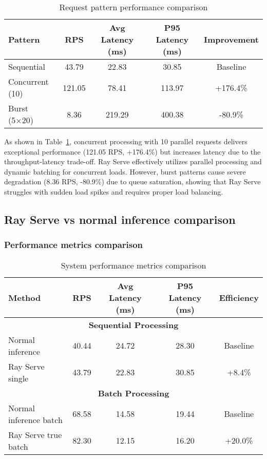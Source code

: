 \begin{table}[htbp]
\centering
\caption{Request pattern performance comparison}
\label{tab:request_patterns}
\begin{tabular}{|l|c|c|c|c|}
\hline
\textbf{Pattern} & \textbf{RPS} & \textbf{Avg Latency (ms)} & \textbf{P95 Latency (ms)} & \textbf{Improvement} \\
\hline
Sequential & 43.79 & 22.83 & 30.85 & Baseline \\
Concurrent (10) & 121.05 & 78.41 & 113.97 & +176.4\% \\
Burst (5×20) & 8.36 & 219.29 & 400.38 & -80.9\% \\
\hline
\end{tabular}
\end{table}

As shown in Table~\ref{tab:request_patterns}, concurrent processing with 10 parallel requests delivers exceptional performance (121.05 RPS, +176.4\%) but increases latency due to the throughput-latency trade-off. Ray Serve effectively utilizes parallel processing and dynamic batching for concurrent loads. However, burst patterns cause severe degradation (8.36 RPS, -80.9\%) due to queue saturation, showing that Ray Serve struggles with sudden load spikes and requires proper load balancing.

\subsection{Ray Serve vs normal inference comparison}

\subsubsection{Performance metrics comparison}

\begin{table}[htbp]
\centering
\caption{System performance metrics comparison}
\label{tab:system_comparison}
\begin{tabular}{|l|c|c|c|c|}
\hline
\textbf{Method} & \textbf{RPS} & \textbf{Avg Latency (ms)} & \textbf{P95 Latency (ms)} & \textbf{Efficiency} \\
\hline
\multicolumn{5}{|c|}{\textbf{Sequential Processing}} \\
\hline
Normal inference & 40.44 & 24.72 & 28.30 & Baseline \\
Ray Serve single & 43.79 & 22.83 & 30.85 & +8.4\% \\
\hline
\multicolumn{5}{|c|}{\textbf{Batch Processing}} \\
\hline
Normal inference batch & 68.58 & 14.58 & 19.44 & Baseline \\
Ray Serve true batch & 82.30 & 12.15 & 16.20 & +20.0\% \\
\hline
\end{tabular}
\end{table}

